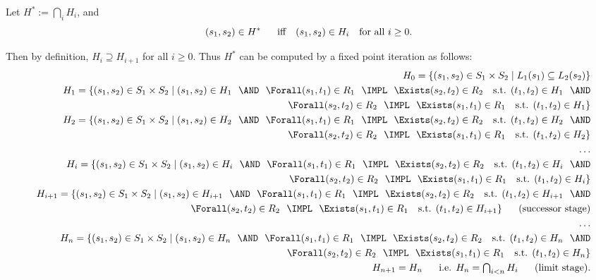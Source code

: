 Let $H^{\ast }:=\bigcap\nolimits_{i}H_{i}$, and%
\begin{equation*}
(s_{1},s_{2})\in H^{\ast }\quad \text{iff\quad }(s_{1},s_{2})\in H_{i}\text{
for all }i\geq 0.
\end{equation*}

Then by definition, $H_{i}\supseteq H_{i+1}$ for all $i\geq 0$. Thus $%
H^{\ast }$ can be computed by a fixed point iteration as follows:%
{\small
\begin{eqnarray*}
&&H_{0}=\{(s_{1},s_{2})\in S_{1}\times S_{2}\mid L_{1}(s_{1})\subseteq
L_{2}(s_{2})\} \\
&&H_{1}=\{(s_{1},s_{2})\in S_{1}\times S_{2}\mid (s_{1},s_{2})\in H_{1} \AND%
\Forall (s_{1},t_{1})\in R_{1}\IMPL\Exists (s_{2},t_{2})\in R_{2}\text{ s.t. }%
(t_{1},t_{2})\in H_{1}\AND \\
&&\Forall (s_{2},t_{2})\in R_{2}\IMPL\Exists (s_{1},t_{1})\in R_{1}\text{
s.t. }(t_{1},t_{2})\in H_{1}\} \\
&&H_{2}=\{(s_{1},s_{2})\in S_{1}\times S_{2}\mid (s_{1},s_{2})\in H_{2}\AND%
\Forall(s_{1},t_{1})\in R_{1}\IMPL\Exists (s_{2},t_{2})\in R_{2}\text{ s.t. }%
(t_{1},t_{2})\in H_{2}\AND \\
&&\Forall (s_{2},t_{2})\in R_{2}\IMPL\Exists (s_{1},t_{1})\in R_{1}\text{
s.t. }(t_{1},t_{2})\in H_{2}\} \\
&&\ldots \\
&&H_{i}=\{(s_{1},s_{2})\in S_{1}\times S_{2}\mid (s_{1},s_{2})\in H_{i} \AND%
\Forall (s_{1},t_{1})\in R_{1}\IMPL\Exists (s_{2},t_{2})\in R_{2}\text{ s.t. }%
(t_{1},t_{2})\in H_{i}\AND \\
&&\Forall (s_{2},t_{2})\in R_{2}\IMPL\Exists (s_{1},t_{1})\in R_{1}\text{
s.t. }(t_{1},t_{2})\in H_{i}\} \\
&&H_{i+1}=\{(s_{1},s_{2})\in S_{1}\times S_{2}\mid (s_{1},s_{2})\in H_{i+1}%
\AND\Forall (s_{1},t_{1})\in R_{1}\IMPL\Exists (s_{2},t_{2})\in R_{2}\text{
s.t. }(t_{1},t_{2})\in H_{i+1}\AND \\
&&\Forall (s_{2},t_{2})\in R_{2}\IMPL\Exists (s_{1},t_{1})\in R_{1}\text{
s.t. }(t_{1},t_{2})\in H_{i+1}\}\quad \text{(successor stage)} \\
&&\ldots \\
&&H_{n}=\{(s_{1},s_{2})\in S_{1}\times S_{2}\mid (s_{1},s_{2})\in H_{n} \AND%
\Forall (s_{1},t_{1})\in R_{1}\IMPL\Exists (s_{2},t_{2})\in R_{2}\text{ s.t. }%
(t_{1},t_{2})\in H_{n}\AND \\
&&\Forall(s_{2},t_{2})\in R_{2}\IMPL\Exists (s_{1},t_{1})\in R_{1}\text{
s.t. }(t_{1},t_{2})\in H_{n}\} \\
&&H_{n+1}=H_{n}\quad \text{i.e. }H_{n}=\tbigcap\nolimits_{i<n}H_{i}\quad\text{%
(limit stage).}
\end{eqnarray*}
}

